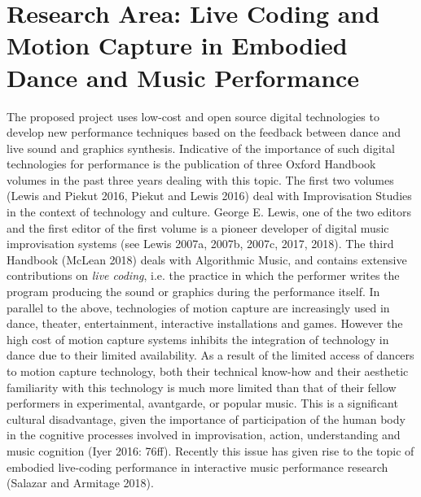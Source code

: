 \section{Research Area: Live Coding and Motion Capture in Embodied Dance and Music Performance}
\label{sec:orgf86591e}
The proposed project uses low-cost and open source digital technologies to develop new performance techniques based on the feedback between dance and live sound and graphics synthesis.  Indicative of the importance of such digital technologies for performance is the publication of three Oxford Handbook volumes in the past three years dealing with this topic.  The first two volumes (Lewis and Piekut 2016, Piekut and Lewis 2016) deal with Improvisation Studies in the context of technology and culture.  George E. Lewis, one of the two editors and the first editor of the first volume is a pioneer developer of digital music improvisation systems (see Lewis 2007a, 2007b, 2007c, 2017, 2018).  The third Handbook (McLean 2018) deals with Algorithmic Music, and contains extensive contributions on \emph{live coding}, i.e. the practice in which the performer writes the program producing the sound or graphics during the performance itself.  In parallel to the above, technologies of motion capture are increasingly used in dance, theater, entertainment, interactive installations and games.  However the high cost of motion capture systems inhibits the integration of technology in dance due to their limited availability.  As a result of the limited access of dancers to motion capture technology, both their technical know-how and their aesthetic familiarity with this technology is much more limited than that of their fellow performers in experimental, avantgarde, or popular music.  This is a significant cultural disadvantage, given the importance of participation of the human body in the cognitive processes involved in improvisation, action, understanding and music cognition (Iyer 2016: 76ff).  Recently this issue has given rise to the topic of embodied live-coding performance in interactive music performance research (Salazar and Armitage 2018). 

